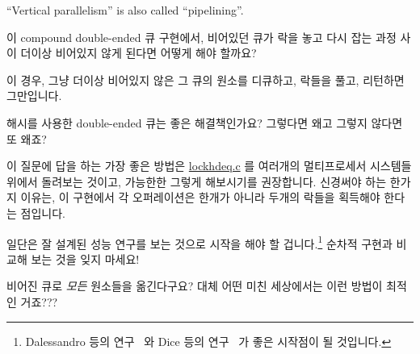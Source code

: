 \begin{enumerate}
	``Vertical parallelism'' is also called ``pipelining''.
	\fi

\QuickQ{}
	이 compound double-ended 큐 구현에서, 비어있던 큐가 락을 놓고 다시 잡는
	과정 사이 더이상 비어있지 않게 된다면 어떻게 해야 할까요?

\QuickA{}
	이 경우, 그냥 더이상 비어있지 않은 그 큐의 원소를 디큐하고, 락들을
	풀고, 리턴하면 그만입니다.

\QuickQ{}
	해시를 사용한 double-ended 큐는 좋은 해결책인가요?
	그렇다면 왜고 그렇지 않다면 또 왜죠?

\QuickA{}
	이 질문에 답을 하는 가장 좋은 방법은 \url{lockhdeq.c} 를 여러개의
	멀티프로세서 시스템들 위에서 돌려보는 것이고, 가능한한 그렇게
	해보시기를 권장합니다.
	신경써야 하는 한가지 이유는, 이 구현에서 각 오퍼레이션은 한개가 아니라
	두개의 락들을 획득해야 한다는 점입니다.

	일단은 잘 설계된 성능 연구를 보는 것으로 시작을 해야 할
	겁니다.\footnote{
		Dalessandro 등의
		연구~\cite{LukeDalessandro:2011:ASPLOS:HybridNOrecSTM:deque} 와
		Dice 등의
		연구~\cite{DavidDice:2010:SCA:HTM:deque} 가 좋은 시작점이 될
		것입니다.}
	순차적 구현과 비교해 보는 것을 잊지 마세요!

\QuickQ{}
	비어진 큐로 \emph{모든} 원소들을 옮긴다구요?
	대체 어떤 미친 세상에서는 이런 방법이 최적인 거죠???
	\iffalse


\end{enumerate}
